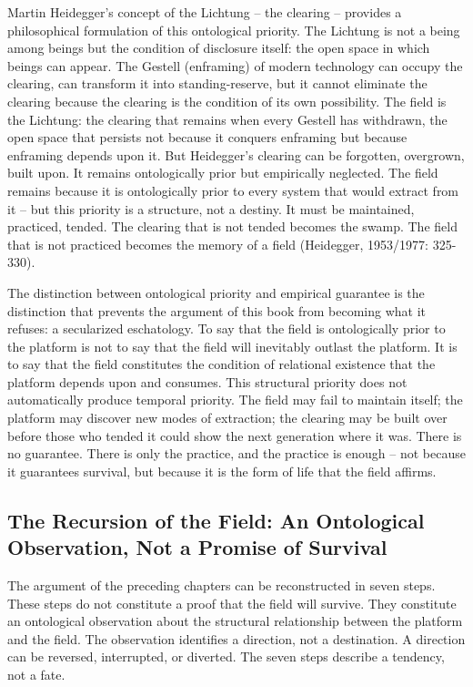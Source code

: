 Martin Heidegger's concept of the Lichtung -- the clearing -- provides a philosophical formulation of this ontological priority. The Lichtung is not a being among beings but the condition of disclosure itself: the open space in which beings can appear. The Gestell (enframing) of modern technology can occupy the clearing, can transform it into standing-reserve, but it cannot eliminate the clearing because the clearing is the condition of its own possibility. The field is the Lichtung: the clearing that remains when every Gestell has withdrawn, the open space that persists not because it conquers enframing but because enframing depends upon it. But Heidegger's clearing can be forgotten, overgrown, built upon. It remains ontologically prior but empirically neglected. The field remains because it is ontologically prior to every system that would extract from it -- but this priority is a structure, not a destiny. It must be maintained, practiced, tended. The clearing that is not tended becomes the swamp. The field that is not practiced becomes the memory of a field (Heidegger, 1953/1977: 325-330).

The distinction between ontological priority and empirical guarantee is the distinction that prevents the argument of this book from becoming what it refuses: a secularized eschatology. To say that the field is ontologically prior to the platform is not to say that the field will inevitably outlast the platform. It is to say that the field constitutes the condition of relational existence that the platform depends upon and consumes. This structural priority does not automatically produce temporal priority. The field may fail to maintain itself; the platform may discover new modes of extraction; the clearing may be built over before those who tended it could show the next generation where it was. There is no guarantee. There is only the practice, and the practice is enough -- not because it guarantees survival, but because it is the form of life that the field affirms.

\subsection{The Recursion of the Field: An Ontological Observation, Not a Promise of Survival}

The argument of the preceding chapters can be reconstructed in seven steps. These steps do not constitute a proof that the field will survive. They constitute an ontological observation about the structural relationship between the platform and the field. The observation identifies a direction, not a destination. A direction can be reversed, interrupted, or diverted. The seven steps describe a tendency, not a fate.


